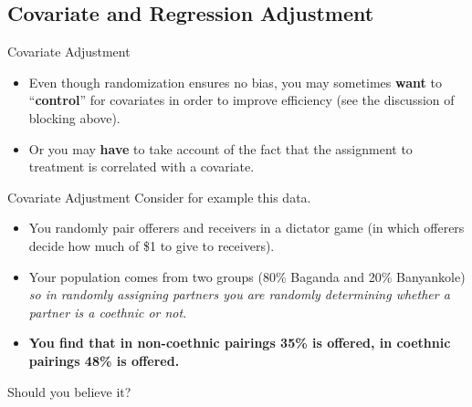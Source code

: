 \documentclass[
  11pt,
  ignorenonframetext,
]{beamer}
\providecommand{\tightlist}{%
  \setlength{\itemsep}{0pt}\setlength{\parskip}{0pt}}\usepackage{longtable,booktabs,array}
\begin{document}
\hypertarget{covariate-and-regression-adjustment}{%
\subsection{Covariate and Regression
Adjustment}\label{covariate-and-regression-adjustment}}

\begin{frame}{Covariate Adjustment\label{CA}}
\protect\hypertarget{covariate-adjustment}{}
\begin{itemize}
\tightlist
\item
  Even though randomization ensures no bias, you may sometimes
  \textbf{want} to ``\textbf{control}'' for covariates in order to
  improve efficiency (see the discussion of blocking above).
\item
  Or you may \textbf{have} to take account of the fact that the
  assignment to treatment is correlated with a covariate.
\end{itemize}
\end{frame}

\begin{frame}{Covariate Adjustment\label{CA}}
\protect\hypertarget{covariate-adjustment-1}{}
Consider for example this data. \bigskip

\begin{itemize}
\tightlist
\item
  You randomly pair offerers and receivers in a dictator game (in which
  offerers decide how much of \$1 to give to receivers).
\item
  Your population comes from two groups (80\% Baganda and 20\%
  Banyankole) \emph{so in randomly assigning partners you are randomly
  determining whether a partner is a coethnic or not}.
\item
  \textbf{You find that in non-coethnic pairings 35\% is offered, in
  coethnic pairings 48\% is offered.}
\end{itemize}

Should you believe it?
\end{frame}
\end{document}
